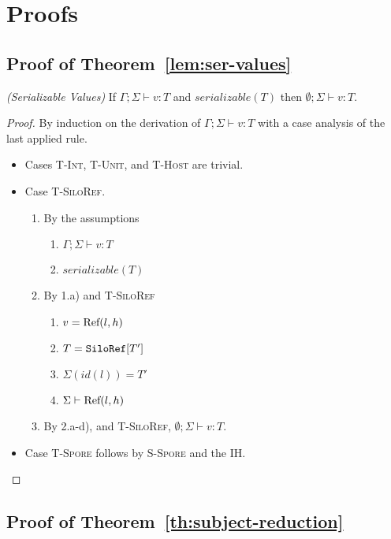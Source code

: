 \section{Proofs}

\subsection{Proof of Theorem~\ref{lem:ser-values}}\label{app:ser-values}

\begin{thmun}
\emph{(Serializable Values)}
If $\Gamma ; \Sigma \vdash v : T$ and $serializable(T)$ then $\emptyset ; \Sigma \vdash v : T$.
\end{thmun}
\begin{proof}
By induction on the derivation of $\Gamma ; \Sigma \vdash v : T$ with a case analysis of the last applied rule.

\begin{itemize}
\item Cases \textsc{T-Int}, \textsc{T-Unit}, and \textsc{T-Host} are trivial.

\item Case \textsc{T-SiloRef}.
\begin{enumerate}
\item By the assumptions
  \begin{enumerate}[label=(\alph*)]
  \item $\Gamma ; \Sigma \vdash v : T$
  \item $serializable(T)$
  \end{enumerate}
\item By 1.a) and \textsc{T-SiloRef}
  \begin{enumerate}[label=(\alph*)]
  \item $v = {\textrm{Ref}(l, h)}$
  \item $T = \texttt{SiloRef}[T']$
  \item $\Sigma(id(l)) = T'$
  \item $\Sigma \vdash {\textrm{Ref}(l, h)}$
  \end{enumerate}
\item By 2.a-d), and \textsc{T-SiloRef}, $\emptyset ; \Sigma \vdash v : T$.
\end{enumerate}

\item Case \textsc{T-Spore} follows by \textsc{S-Spore} and the IH.
\end{itemize}
\end{proof}


\subsection{Proof of Theorem~\ref{th:subject-reduction}}\label{app:subject-reduction}

